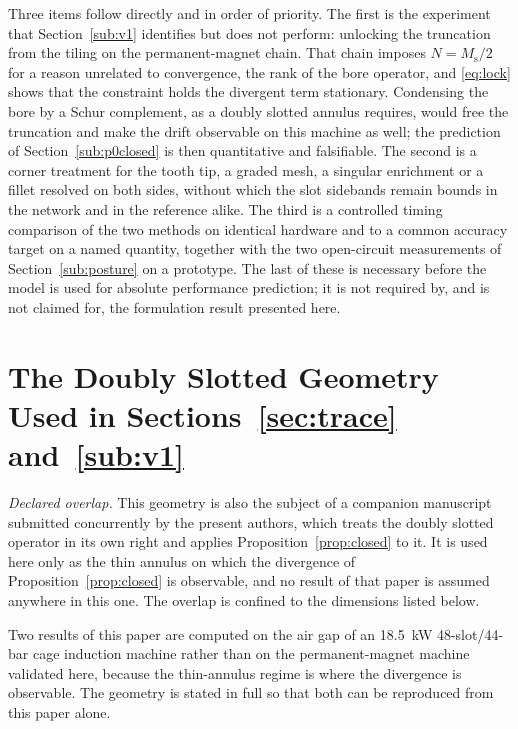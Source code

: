 \documentclass[10pt,a4paper,twocolumn]{article}
\theoremstyle{plain}
\theoremstyle{remark}
\begin{document}
Three items follow directly and in order of priority. The first is the
experiment that Section~\ref{sub:v1} identifies but does not perform:
unlocking the truncation from the tiling on the permanent-magnet chain.
That chain imposes $N=M_{\mathrm{s}}/2$ for a reason unrelated to
convergence, the rank of the bore operator, and \eqref{eq:lock} shows
that the constraint holds the divergent term stationary. Condensing the
bore by a Schur complement, as a doubly slotted annulus requires,
would free the truncation and make the drift observable on
this machine as well; the prediction of Section~\ref{sub:p0closed} is
then quantitative and falsifiable. The second is a corner treatment for
the tooth tip, a graded mesh, a singular enrichment or a fillet
resolved on both sides, without which the slot sidebands remain bounds
in the network and in the reference alike. The third is a controlled
timing comparison of the two methods on identical hardware and to a
common accuracy target on a named quantity, together with the two
open-circuit measurements of Section~\ref{sub:posture} on a prototype. The last of
these is necessary before the model is used for absolute performance
prediction; it is not required by, and is not claimed for, the
formulation result presented here.


\appendix

\section{The Doubly Slotted Geometry Used in Sections~\ref{sec:trace} and~\ref{sub:v1}}
\label{app:im}

\emph{Declared overlap.} This geometry is also the subject of a companion
manuscript submitted concurrently by the present authors, which treats
the doubly slotted operator in its own right and applies
Proposition~\ref{prop:closed} to it. It is used here only as the thin
annulus on which the divergence of Proposition~\ref{prop:closed} is
observable, and no result of that paper is assumed anywhere in this one.
The overlap is confined to the dimensions listed below.

Two results of this paper are computed on the air gap of an
\SI{18.5}{\kilo\watt} 48-slot/44-bar cage induction machine rather than
on the permanent-magnet machine validated here, because the thin-annulus
regime is where the divergence is observable. The geometry is stated in
full so that both can be reproduced from this paper alone.
\end{document}
